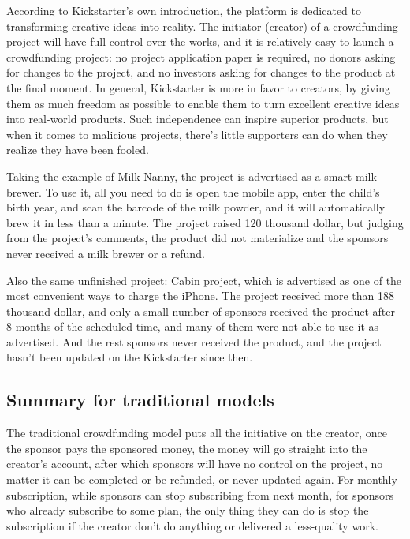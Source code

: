 \documentclass[12pt,a4paper]{article}
\begin{document}
    According to Kickstarter's own introduction\cite{kickstarter_about},
    the platform is dedicated to transforming creative ideas into reality.
    The initiator (creator) of a crowdfunding project will have full
    control over the works, and it is relatively easy to launch a
    crowdfunding project: no project application paper is required, no
    donors asking for changes to the project, and no investors asking
    for changes to the product at the final moment. In general, Kickstarter
    is more in favor to creators, by giving them as much freedom as
    possible to enable them to turn excellent creative ideas into
    real-world products. Such independence can inspire superior
    products, but when it comes to malicious projects, there's little
    supporters can do when they realize they have been fooled.

    Taking the example of Milk Nanny\cite{kickstarter_milk_nanny},
    the project is advertised as a smart milk brewer.
    To use it, all you need to do is open the mobile app, enter the
    child's birth year, and scan the barcode of the milk powder,
    and it will automatically brew it in less than a minute.
    The project raised 120 thousand dollar, but judging from the
    project's comments, the product did not materialize and the sponsors
    never received a milk brewer or a refund.

    Also the same unfinished project: Cabin project\cite{kickstarter_cabin},
    which is advertised as one of the most convenient ways to charge the iPhone.
    The project received more than 188 thousand dollar, and only a small number of
    sponsors received the product after 8 months of the scheduled time, and
    many of them were not able to use it as advertised. And the rest sponsors
    never received the product, and the project hasn't been updated on
    the Kickstarter since then.

    \subsection{Summary for traditional models}\label{subsec:tradition_summary}

    The traditional crowdfunding model puts all the initiative on the creator,
    once the sponsor pays the sponsored money, the money will go straight
    into the creator's account, after which sponsors will have no control on
    the project, no matter it can be completed or be refunded, or never updated again.
    For monthly subscription, while sponsors can stop subscribing from next month,
    for sponsors who already subscribe to some plan, the only thing they can do is stop
    the subscription if the creator don't do anything or delivered a less-quality work.
\end{document}
